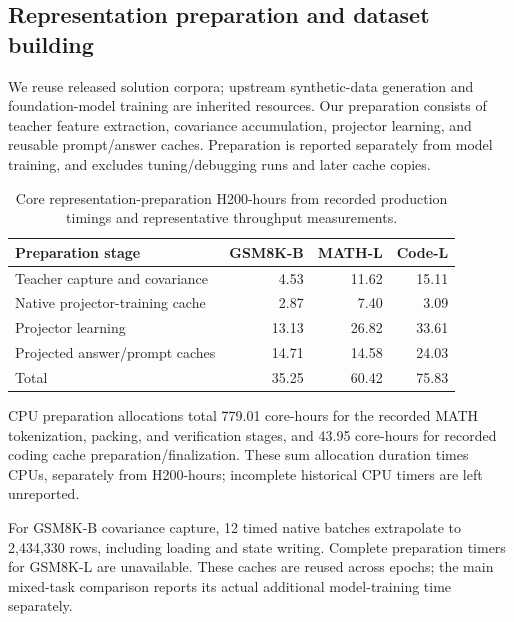 \documentclass{article}
\newenvironment{revision}{\begingroup\color{blue}}{\endgroup}
\begin{document}
\begin{revision}
\subsection{Representation preparation and dataset building}
\label{app:preparationresources}
We reuse released solution corpora; upstream synthetic-data generation and foundation-model training are inherited resources. Our preparation consists of teacher feature extraction, covariance accumulation, projector learning, and reusable prompt/answer caches. Preparation is reported separately from model training, and excludes tuning/debugging runs and later cache copies.
\begin{table}[htbp]\color{blue}\centering\small
\caption{Core representation-preparation H200-hours from recorded production timings and representative throughput measurements.}
\label{tab:preparationcosts}
\begin{tabular}{@{}lrrr@{}}\toprule
Preparation stage & GSM8K-B & MATH-L & Code-L\\\midrule
Teacher capture and covariance & 4.53 & 11.62 & 15.11\\
Native projector-training cache & 2.87 & 7.40 & 3.09\\
Projector learning & 13.13 & 26.82 & 33.61\\
Projected answer/prompt caches & 14.71 & 14.58 & 24.03\\\midrule
Total & 35.25 & 60.42 & 75.83\\\bottomrule
\end{tabular}
\end{table}
CPU preparation allocations total 779.01 core-hours for the recorded MATH tokenization, packing, and verification stages, and 43.95 core-hours for recorded coding cache preparation/finalization. These sum allocation duration times CPUs, separately from H200-hours; incomplete historical CPU timers are left unreported.

For GSM8K-B covariance capture, 12 timed native batches extrapolate to 2,434,330 rows, including loading and state writing. Complete preparation timers for GSM8K-L are unavailable. These caches are reused across epochs; the main mixed-task comparison reports its actual additional model-training time separately.
\end{revision}
\end{document}
